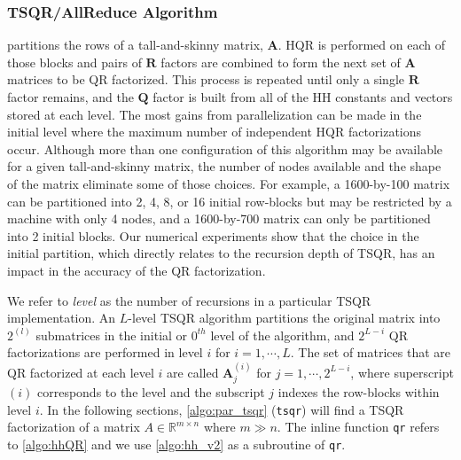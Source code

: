 \documentclass[review,onefignum,onetabnum]{siamart190516}
\newcommand{\R}{\mathbb{R}}
\newcommand{\bb}[1]{\mathbf{#1}}
\begin{document}
\subsubsection{TSQR/AllReduce Algorithm}
 partitions the rows of a tall-and-skinny matrix, $\bb{A}$. 
HQR is performed on each of those blocks and pairs of $\bb{R}$ factors are combined to form the next set of $\bb{A}$ matrices to be QR factorized. 
This process is repeated until only a single $\bb{R}$ factor remains, and the $\bb{Q}$ factor is built from all of the HH constants and vectors stored at each level.
The most gains from parallelization can be made in the initial level where the maximum number of independent HQR factorizations occur. 
Although more than one configuration of this algorithm may be available for a given tall-and-skinny matrix, the number of nodes available and the shape of the matrix eliminate some of those choices. 
For example, a 1600-by-100 matrix can be partitioned into 2, 4, 8, or 16 initial row-blocks but may be restricted by a machine with only 4 nodes, and a 1600-by-700 matrix can only be partitioned into 2 initial blocks.
Our numerical experiments show that the choice in the initial partition, which directly relates to the recursion depth of TSQR, has an impact in the accuracy of the QR factorization. \par

We refer to \emph{level} as the number of recursions in a particular TSQR implementation. 
An $L$-level TSQR algorithm partitions the original matrix into $2^{(l)}$ submatrices in the initial or $0^{th}$ level of the algorithm, and $2^{L-i}$ QR factorizations are performed in level $i$ for $i = 1 , \cdots, L$. 
The set of matrices that are QR factorized at each level $i$ are called $\bb{A}_j^{(i)}$ for $j = 1, \cdots, 2^{L-i}$, where superscript $(i)$ corresponds to the level and the subscript $j$ indexes the row-blocks within level $i$.
In the following sections, \cref{algo:par_tsqr} ({\tt tsqr}) will find a TSQR factorization of a matrix $A\in\R^{m\times n}$ where $m \gg n$. 
The inline function {\tt qr} refers to \cref{algo:hhQR} and we use \cref{algo:hh_v2} as a subroutine of {\tt qr}.
\end{document}
